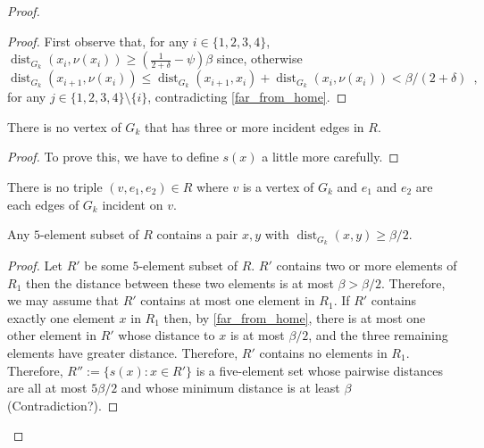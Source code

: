 \documentclass{patmorin}
\DeclareMathOperator{\dist}{dist}
\begin{document}
\begin{proof}
\begin{proof}
    First observe that, for any $i\in\{1,2,3,4\}$,  $\dist_{G_k}(x_i,\nu(x_i)) \ge (\tfrac{1}{2+\delta}-\psi)\beta$ since, otherwise
    \[  \dist_{G_k}(x_{i+1},\nu(x_i))\le \dist_{G_k}(x_{i+1},x_i) +
    \dist_{G_k}(x_i,\nu(x_i)) < \beta/(2+\delta) \enspace ,
    \]
    for any $j\in\{1,2,3,4\}\setminus\{i\}$,
    contradicting \cref{far_from_home}.

  \end{proof}

  \begin{clm}
      There is no vertex of $G_k$ that has three or more incident edges in $R$.
  \end{clm}

  \begin{proof}
    To prove this, we have to define $s(x)$ a little more carefully.
  \end{proof}

  \begin{clm}
    There is no triple $(v,e_1,e_2)\in R$ where $v$ is a vertex of $G_k$ and $e_1$ and $e_2$ are each edges of $G_k$ incident on $v$.
  \end{clm}

  \begin{clm}
    Any $5$-element subset of $R$ contains a pair $x,y$ with $\dist_{G_k}(x,y)\ge\beta/2$.
  \end{clm}

  \begin{proof}
    Let $R'$ be some $5$-element subset of $R$. $R'$ contains two or more elements of $R_1$ then the distance between these two elements is at most $\beta>\beta/2$.  Therefore, we may assume that $R'$ contains at most one element in $R_1$.  If $R'$ contains exactly one element $x$ in $R_1$ then, by \cref{far_from_home}, there is at most one other element in $R'$ whose distance to $x$ is at most $\beta/2$, and the three remaining elements have greater distance.  Therefore, $R'$ contains no elements in $R_1$.  Therefore, $R'':=\{s(x):x\in R'\}$ is a five-element set whose pairwise distances are all at most $5\beta/2$ and whose minimum distance is at least $\beta$ (Contradiction?).
  \end{proof}


\end{proof}
\end{document}
